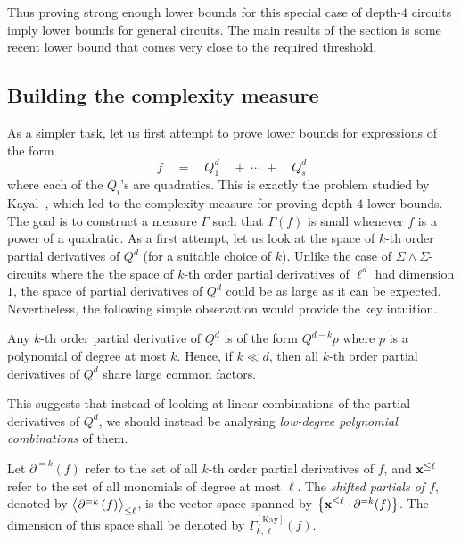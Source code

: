 \documentclass{birkjour}
\newcommand{\CM}[1]{\Gamma^{\mathrm{[#1]}}}
\newcommand{\spaced}[1]{\quad#1\quad}
\newcommand{\SPD}[3]{\inangle{\partial^{=#1}\inparen{#3}}_{\leq #2}}
\begin{document}
Thus proving strong enough lower bounds for this special case of depth-$4$ circuits imply lower bounds for general circuits. The main results of the section is some recent lower bound \cite{gkks13,KSS13,FLMS13} that comes very close to the required threshold. 

\subsection{Building the complexity measure}

As a simpler task, let us first attempt to prove lower bounds for expressions of the form
$$
f \quad = \quad Q_1^{d} \spaced{+ \;\cdots\; + } Q_s^{d}
$$
where each of the $Q_i$'s are quadratics. This is exactly the problem studied by Kayal~\cite{k2}, which led to the complexity measure for proving depth-$4$ lower bounds. \\

The goal is to construct a measure $\Gamma$ such that $\Gamma(f)$ is small whenever $f$ is a power of a quadratic. As a first attempt, let us look at the space of $k$-th order partial derivatives of $Q^d$ (for a suitable choice of $k$). Unlike the case of $\Sigma\!\wedge\!\Sigma$-circuits where the the space of $k$-th order partial derivatives of $\ell^d$ had dimension $1$, the space of partial derivatives of $Q^{d}$ could be as large as it can be expected. Nevertheless, the following simple observation would provide the key intuition.

\begin{observation} 
  Any $k$-th order partial derivative of $Q^d$ is of the form $Q^{d-k}p$ where $p$ is a polynomial of degree at most $k$. Hence, if $k \ll d$, then all $k$-th order partial derivatives of $Q^d$ share large common factors.
\end{observation}

This suggests that instead of looking at linear combinations of the partial derivatives of $Q^d$, we should instead be analysing \emph{low-degree polynomial combinations} of them. 
\begin{definition}\label{defn:shifted-partials}
  Let $\partial^{=k}(f)$ refer to the set of all $k$-th order partial derivatives of $f$, and $\mathbf{x}^{\leq \ell}$ refer to the set of all monomials of degree at most $\ell$. The \emph{shifted partials of $f$}, denoted by $\SPD{k}{\ell}{f}$, is the vector space spanned by $\left\{\mathbf{x}^{\leq \ell} \cdot \partial^{=k}(f)\right\}$. The dimension of this space shall be denoted by $\CM{Kay}_{k,\ell}(f)$. 
\end{definition}
\end{document}
